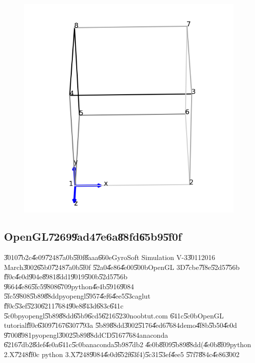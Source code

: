 \begin{figure}[th]
\begin{center}
{\includegraphics{./figs/construct_cube_8vertices_opengl.png}}
\end{center}
\end{figure}

\bigskip

\subsection{OpenGL\U{7269}\U{9ad4}\U{7e6a}\U{88fd}\U{65b9}\U{5f0f}}

\U{3010}\U{7b2c}\U{4e09}\U{7248}\U{7a0b}\U{5f0f}\U{8aaa}\U{660e}GyroSoft
Simulation V-3\U{3011}2016 March\U{3002}\U{65b0}\U{7248}\U{7a0b}\U{5f0f}%
\U{52a0}\U{4e86}\U{4e00}\U{500b}OpenGL 3D\U{7cbe}\U{7f8e}\U{52d5}\U{756b}%
\U{ff0c}\U{4e0d}\U{904e}\U{8981}\U{8dd1}\U{9019}\U{500b}\U{52d5}\U{756b}%
\U{9664}\U{4e86}\U{5fc5}\U{9808}\U{6709}python\U{4e4b}\U{5916}\U{9084}%
\U{5fc5}\U{9808}\U{5b89}\U{88dd}pyopengl\U{5957}\U{4ef6}\U{4ee5}\U{53ca}glut%
\U{ff0c}\U{53ef}\U{5230}\U{6211}\U{7684}\U{90e8}\U{843d}\U{683c}\U{641c}%
\U{5c0b}pyopengl\U{5b89}\U{88dd}\U{65b9}\U{6cd5}\U{6216}\U{5230}noobtut.com%
\U{641c}\U{5c0b}OpenGL tutorial\U{ff0c}\U{6309}\U{7167}\U{6307}\U{793a}%
\U{5b89}\U{88dd}\U{3002}\U{5176}\U{4ed6}\U{7684}demo\U{4f8b}\U{5b50}\U{4e0d}%
\U{9700}\U{8981}pyopengl\U{3002}\U{5b89}\U{88dd}CD\U{5167}\U{7684}anaconda%
\U{6216}\U{7db2}\U{8def}\U{4e0a}\U{641c}\U{5c0b}anaconda\U{5b98}\U{7db2}%
\U{4e0b}\U{8f09}\U{5b89}\U{88dd}(\U{4e0b}\U{8f09}python 2.X\U{7248}\U{ff0c}%
python 3.X\U{7248}\U{9084}\U{4e0d}\U{652f}\U{63f4})\U{5c31}\U{53ef}\U{4ee5}%
\U{57f7}\U{884c}\U{4e86}\U{3002}

